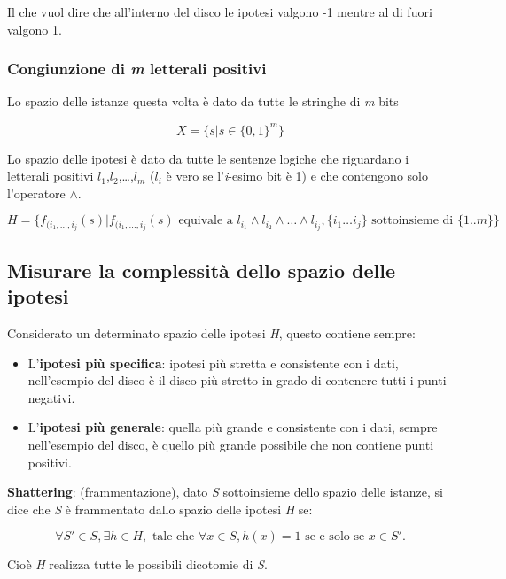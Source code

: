 Il che vuol dire che all'interno del disco le ipotesi valgono -1 mentre
al di fuori valgono 1.

\subsubsection{\texorpdfstring{Congiunzione di \emph{m} letterali positivi}{Congiunzione di m letterali positivi}}\label{congiunzione-di-m-letterali-positivi}

Lo spazio delle istanze questa volta è dato da tutte le stringhe di \emph{m} bits

$$
X = \{s | s \in \{0,1\}^m\}
$$

Lo spazio delle ipotesi è dato da tutte le sentenze logiche che
riguardano i letterali positivi $l_1$,$l_2$,\ldots{},$l_m$ ($l_i$ è vero se
l'\emph{i}-esimo bit è 1) e che contengono solo l'operatore $\wedge$.

$$
H = \{ f_{(i_1,\ldots,i_j}(s) | f_{(i_1,\ldots,i_j}(s) \text{ equivale a } l_{i_1} \wedge l_{i_2} \wedge \ldots \wedge l_{i_j}, \{i_1\ldots{}i_j\} \text{ sottoinsieme di }  \{1..m\}\}
$$

\subsection{Misurare la complessità dello spazio delle ipotesi}\label{misurare-la-complessituxe0-dello-spazio-delle-ipotesi}

Considerato un determinato spazio delle ipotesi \emph{H}, questo
contiene sempre:

\begin{itemize}
\item
  L'\textbf{ipotesi più specifica}: ipotesi più stretta e consistente con
  i dati, nell'esempio del disco è il disco più stretto in grado di
  contenere tutti i punti negativi.
\item
  L'\textbf{ipotesi più generale}: quella più grande e consistente con i
  dati, sempre nell'esempio del disco, è quello più grande
  possibile che non contiene punti positivi.
\end{itemize}

\textbf{Shattering}: (frammentazione), dato \emph{S} sottoinsieme dello
spazio delle istanze, si dice che \emph{S} è frammentato dallo spazio
delle ipotesi \emph{H} se:

$$ 
\forall S' \in S, \exists h \in H, \text{ tale che } \forall x \in S, h(x) = 1 \text{ se e solo se } x \in S'.
$$

Cioè \emph{H} realizza tutte le possibili dicotomie di \emph{S}.

